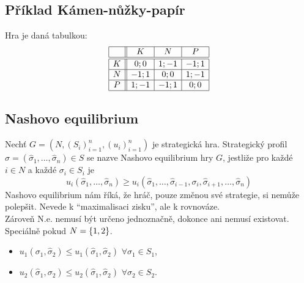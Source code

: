 \subsection{Příklad Kámen-nůžky-papír}
Hra je daná tabulkou:
\[
\begin{array}{|c| |c|c|c|}
    \hline
    & K & N & P \\ \hline \hline
    K & 0;0 & 1;-1 & -1;1 \\ \hline
    N & -1;1 & 0;0 & 1;-1 \\ \hline
    P & 1;-1 & -1;1 & 0;0 \\ \hline
\end{array}
\]
\newpage
\subsection{Nashovo equilibrium}\label{nash}
Nechť $G = (N, (S_i)^n_{i=1}, (u_i)^n_{i=1})$ je strategická hra. Strategický profil $\hat \sigma = 
(\hat \sigma_1, \dots, \hat \sigma_n) \in S$ se nazve Nashovo equilibrium hry $G$, jestliže pro každé $i \in N$ a každé
$\sigma_i \in S_i$ je 
\[
    u_i(\hat \sigma_1, \dots, \hat \sigma_n) \geq u_i (\hat\sigma_1, \dots, \hat\sigma_{i-1}, \sigma_i, 
    \hat \sigma_{i+1}, \dots, \hat \sigma_n)
\]
Nashovo equilibrium nám říká, že hráč, pouze změnou své strategie, si nemůže polepšit. Nevede k 
\enquote{maximalisaci zisku}, ale k rovnováze.\\
Zároveň N.e. nemusí být určeno jednoznačně, dokonce ani nemusí existovat.\\
Speciálně pokud $N = \left\lbrace 1,2 \right\rbrace$.
\begin{itemize}
    \item $u_1(\sigma_1, \hat \sigma_2) \leq u_1(\hat \sigma_1, \hat \sigma_2)$ $\forall \sigma_1 \in S_1$,
    \item $u_2(\hat \sigma_1, \sigma_2) \leq u_2(\hat \sigma_1, \hat \sigma_2)$ $\forall \sigma_2 \in S_2$.
\end{itemize}

